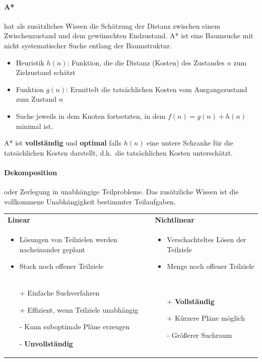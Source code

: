 \paragraph*{A*}
hat als zusätzliches Wissen die Schätzung der \glq Distanz\grq{} zwischen einem Zwischenzustand und dem gewünschten Endzustand.
A* ist eine Baumsuche mit nicht systematischer Suche entlang der Baumstruktur.
\begin{itemize}
	\item Heuristik $h(n)$: Funktion, die die Distanz (Kosten) des Zustandes $n$ zum Zielzustand schätzt
	\item Funktion $g(n)$: Ermittelt die tatsächlichen Kosten vom Ausgangszustand zum Zustand $n$
	\item Suche jeweils in dem Knoten fortsetzten, in dem $f(n) = g(n) + h(n)$ minimal ist.
\end{itemize}
A* ist \textbf{vollständig} und \textbf{optimal} falls $h(n)$ eine untere Schranke für die tatsächlichen Kosten darstellt, d.h.\ die tatsächlichen Kosten unterschätzt.

\paragraph*{Dekomposition} oder Zerlegung in unabhängige Teilprobleme.
Das zusätzliche Wissen ist die vollkommene Unabhängigkeit bestimmter Teilaufgaben.
\vspace{1em} \\
\begin{tabular}{p{} p{}}
\textbf{Linear} & \textbf{Nichtlinear} \\
\begin{itemize}
	\item Lösungen von Teilzielen werden nacheinander geplant
	\item Stack noch offener Teilziele
\end{itemize}
&
\begin{itemize}
	\item Verschachteltes Lösen der Teilziele
	\item Menge noch offener Teilziele
\end{itemize}
\\
\begin{itemize}
	\item[+] Einfache Suchverfahren
	\item[+] Effizient, wenn Teilziele unabhängig
	\item[-] Kann suboptimale Pläne erzeugen
	\item[-] \textbf{Unvollständig}
\end{itemize}
&
\begin{itemize}
	\item[+] \textbf{Vollständig}
	\item[+] Kürzere Pläne möglich
	\item[-] Größerer Suchraum
\end{itemize}
\end{tabular}

